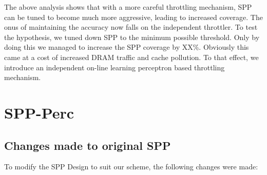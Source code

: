\documentclass{sig-alternate}
\begin{document}
The above analysis shows that with a more careful throttling mechanism, SPP can be tuned to become much more aggressive, leading to increased coverage. 
The onus of maintaining the accuracy now falls on the independent throttler. 
To test the hypothesis, we tuned down SPP to the minimum possible threshold. 
Only by doing this we managed to increase the SPP coverage by XX\%. 
Obviously this came at a cost of increased DRAM traffic and cache pollution. 
To that effect, we introduce an independent on-line learning perceptron based throttling mechanism.

\section{SPP-Perc}

\subsection{Changes made to original SPP}
To modify the SPP Design to suit our scheme, the following changes were made:
\end{document}
